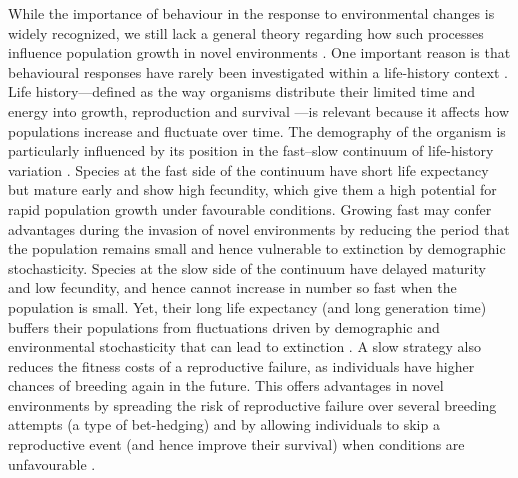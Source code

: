 While the importance of behaviour in the response to
environmental changes is widely recognized, we still lack a
general theory regarding how such processes influence
population growth in novel environments \citep{Sol2016}. One important
reason is that behavioural responses have rarely been
investigated within a life-history context \citep{Sol2016, Ricklefs2004}. Life
history—defined as the way organisms distribute their limited
time and energy into growth, reproduction and
survival \citep{stearns1992evolution}—is relevant because it affects how populations
increase and fluctuate over time. The demography of the
organism is particularly influenced by its position in the
fast–slow continuum of life-history variation \citep{Stearns1983a}. Species
at the fast side of the continuum have short life expectancy
but mature early and show high fecundity, which give
them a high potential for rapid population growth under
favourable conditions. Growing fast may confer advantages
during the invasion of novel environments by reducing the
period that the population remains small and hence vulnerable
to extinction by demographic stochasticity. Species at
the slow side of the continuum have delayed maturity and
low fecundity, and hence cannot increase in number so fast
when the population is small. Yet, their long life expectancy
(and long generation time) buffers their populations from
fluctuations driven by demographic and environmental stochasticity
that can lead to extinction \citep{Saether2013, Saether2004}. A slow strategy
also reduces the fitness costs of a reproductive failure, as individuals
have higher chances of breeding again in the future.
This offers advantages in novel environments by spreading
the risk of reproductive failure over several breeding attempts
(a type of bet-hedging) and by allowing individuals to skip a
reproductive event (and hence improve their survival) when
conditions are unfavourable \citep{Sol2012a}.

